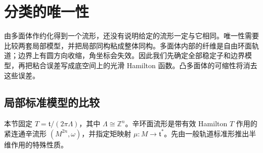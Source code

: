 
% 
% 

\section{分类的唯一性}
\label{g4:sec:1204}

由多面体作约化得到一个流形，还没有说明给定的流形一定与它相同。唯一性需要比较两套局部模型，并把局部同构粘成整体同构。多面体内部的纤维是自由环面轨道；边界上有圆方向收缩，角坐标会失效。因此我们先确定全部稳定子和边界模型，再把粘合误差写成底空间上的光滑 Hamilton 函数。凸多面体的可缩性将消去这些误差。

\subsection{局部标准模型的比较}
\label{g4:subsec:1204:01}
本节固定 \(T=\mathfrak t/(2\pi\Lambda)\)，其中 \(\Lambda\cong\mathbb Z^n\)。辛环面流形是带有效 Hamilton \(T\) 作用的紧连通辛流形 \((M^{2n},\omega)\)，并指定矩映射 \(\mu:M\to\mathfrak t^*\)。先由一般轨道标准形推出半维作用的特殊性质。

